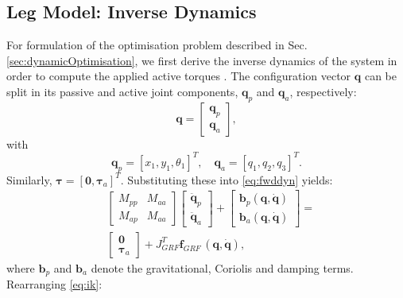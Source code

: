 \documentclass[letterpaper, 10 pt, conference]{ieeeconf}  %
\begin{document}
\subsection{Leg Model: Inverse Dynamics}
For formulation of the optimisation problem described in Sec. \ref{sec:dynamicOptimisation}, we first derive the inverse dynamics of the system in order to compute the applied active torques \cite{nakanishi2007inverse}. The configuration vector $\mathbf{q}$ can be split in its passive and active joint components, $\mathbf{q}_p$ and $\mathbf{q}_a$, respectively:
\begin{equation}
\mathbf{q} =
\begin{bmatrix}
	\mathbf{q}_p \\
	\mathbf{q}_a
\end{bmatrix},
\end{equation}
with
\begin{equation}
	\mathbf{q}_p = [x_1,y_1,\theta_1]^T, \quad  
	\mathbf{q}_a = [q_1,q_2,q_3]^T.
\end{equation}
\noindent
Similarly, $\boldsymbol{\tau} = \left[\mathbf{0},\boldsymbol{\tau}_a\right]^T$. Substituting these into \eqref{eq:fwddyn} yields:
\begin{equation}
	\begin{aligned}
		&\left[\begin{array}{cc}  
		M_{pp} & M_{aa}\\
		M_{ap} & M_{aa}
		\end{array} \right]
		\left[\begin{array}{c}  
		\mathbf{\ddot q}_p\\
		\mathbf{\ddot q}_a
		\end{array} \right] +
		\left[\begin{array}{c}  
		\mathbf{b}_p \mathbf{(q,\dot q)}\\
		\mathbf{b}_a \mathbf{(q,\dot q)}
		\end{array} \right] 
		=\\
		&\left[\begin{array}{c}  
		\mathbf{0}\\
		\boldsymbol{\tau}_a
		\end{array} \right] 
		+
		J_{GRF}^T \mathbf{f}_{GRF} \, \mathbf{(q, \dot q)},
	\end{aligned}
	\label{eq:ik}
\end{equation}		
where $\mathbf{b}_p$ and $\mathbf{b}_a$ denote the gravitational, Coriolis and damping terms. 
Rearranging \eqref{eq:ik}:
\end{document}
